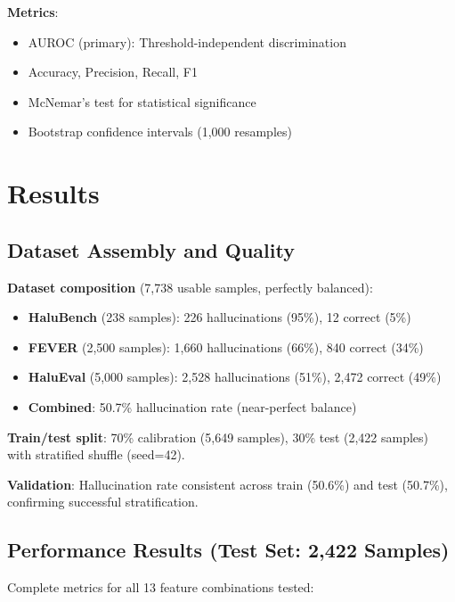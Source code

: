 \documentclass[11pt]{article}
\begin{document}
\textbf{Metrics}:
\begin{itemize}
\item AUROC (primary): Threshold-independent discrimination
\item Accuracy, Precision, Recall, F1
\item McNemar's test for statistical significance
\item Bootstrap confidence intervals (1,000 resamples)
\end{itemize}

\section{Results}
\label{sec:results}

\subsection{Dataset Assembly and Quality}

\textbf{Dataset composition} (7,738 usable samples, perfectly balanced):
\begin{itemize}
\item \textbf{HaluBench} (238 samples): 226 hallucinations (95\%), 12 correct (5\%)
\item \textbf{FEVER} (2,500 samples): 1,660 hallucinations (66\%), 840 correct (34\%)
\item \textbf{HaluEval} (5,000 samples): 2,528 hallucinations (51\%), 2,472 correct (49\%)
\item \textbf{Combined}: 50.7\% hallucination rate (near-perfect balance)
\end{itemize}

\textbf{Train/test split}: 70\% calibration (5,649 samples), 30\% test (2,422 samples) with stratified shuffle (seed=42).

\textbf{Validation}: Hallucination rate consistent across train (50.6\%) and test (50.7\%), confirming successful stratification.

\subsection{Performance Results (Test Set: 2,422 Samples)}

Complete metrics for all 13 feature combinations tested:
\end{document}
